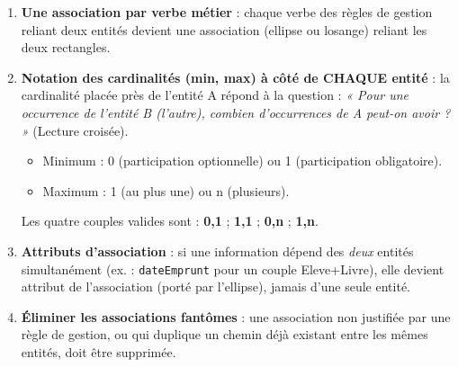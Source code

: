 \documentclass[11pt]{article}
\begin{document}
\begin{methode}
\begin{enumerate}
\item \textbf{Une association par verbe métier} : chaque verbe des règles de gestion reliant deux entités devient une association (ellipse ou losange) reliant les deux rectangles.
\item \textbf{Notation des cardinalités (min, max) à côté de CHAQUE entité} : la cardinalité placée près de l'entité A répond à la question : \emph{« Pour une occurrence de l'entité B (l'autre), combien d'occurrences de A peut-on avoir ? »} (Lecture croisée).
\begin{itemize}
\item Minimum : 0 (participation optionnelle) ou 1 (participation obligatoire).
\item Maximum : 1 (au plus une) ou n (plusieurs).
\end{itemize}
Les quatre couples valides sont : \textbf{0,1} ; \textbf{1,1} ; \textbf{0,n} ; \textbf{1,n}.
\item \textbf{Attributs d'association} : si une information dépend des \emph{deux} entités simultanément (ex. : \texttt{dateEmprunt} pour un couple Eleve+Livre), elle devient attribut de l'association (porté par l'ellipse), jamais d'une seule entité.
\item \textbf{Éliminer les associations fantômes} : une association non justifiée par une règle de gestion, ou qui duplique un chemin déjà existant entre les mêmes entités, doit être supprimée.
\end{enumerate}
\end{methode}
\end{document}

